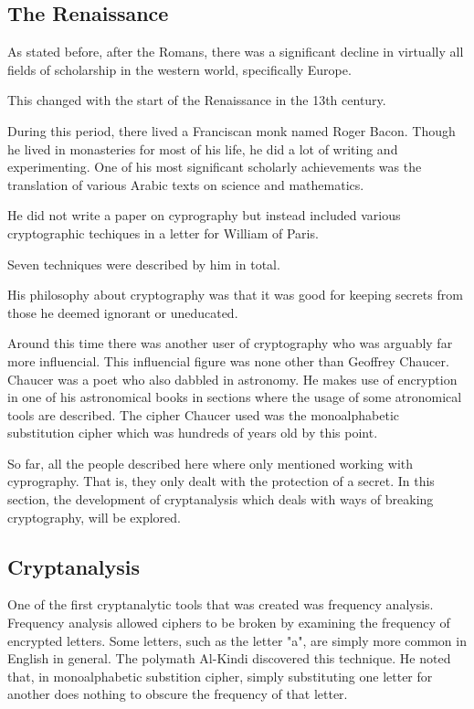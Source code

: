 \documentclass{article}
\begin{document}
    \subsection{The Renaissance}

    As stated before, after the Romans, there was a significant decline in
    virtually all fields of scholarship in the western world, specifically Europe.

    This changed with the start of the Renaissance in the 13th century.

    During this period, there lived a Franciscan monk named Roger Bacon.
    Though he lived in monasteries for most of his life, he did a lot of writing
    and experimenting.
    One of his most significant scholarly achievements was the translation
    of various Arabic texts on science and mathematics.
    
    He did not write a paper on cyprography but instead included various
    cryptographic techiques in a letter for William of Paris.

    Seven techniques were described by him in total.
   
    His philosophy about cryptography was that it was good for keeping secrets
    from those he deemed ignorant or uneducated.

    Around this time there was another user of cryptography who was arguably
    far more influencial. This influencial figure was none other than Geoffrey Chaucer.
    Chaucer was a poet who also dabbled in astronomy. He makes use of encryption
    in one of his astronomical books in sections where the usage of some atronomical tools
    are described.
    The cipher Chaucer used was the monoalphabetic substitution cipher which was hundreds
    of years old by this point.

    So far, all the people described here where only mentioned working with cyprography.
    That is, they only dealt with the protection of a secret. In this section, the development
    of cryptanalysis which deals with ways of breaking cryptography, will be explored.

    \subsection{Cryptanalysis}

    One of the first cryptanalytic tools that was created was frequency analysis.
    Frequency analysis allowed ciphers to be broken by examining the frequency of
    encrypted letters. Some letters, such as the letter "a", are simply more common
    in English in general.
    The polymath Al-Kindi discovered this technique. He noted that, in monoalphabetic
    substition cipher, simply substituting one letter for another does nothing
    to obscure the frequency of that letter.
\end{document}
